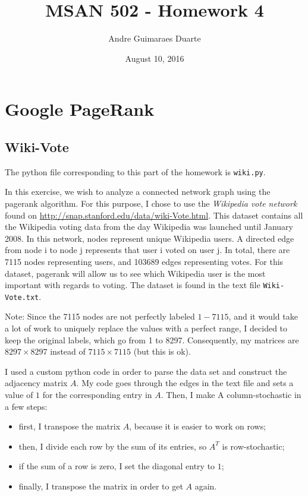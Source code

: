 \documentclass[]{article}
\title{MSAN 502 - Homework 4}
\author{Andre Guimaraes Duarte}
\date{August 10, 2016}
\begin{document}
\maketitle

\section*{Google PageRank}
\subsection*{Wiki-Vote}
The python file corresponding to this part of the homework is \texttt{wiki.py}.

In this exercise, we wish to analyze a connected network graph using the pagerank algorithm. For this purpose, I chose to use the \textit{Wikipedia vote network} found on \url{http://snap.stanford.edu/data/wiki-Vote.html}. This dataset contains all the Wikipedia voting data from the day Wikipedia was launched until January 2008. In this network, nodes represent unique Wikipedia users. A directed edge from node i to node j represents that user i voted on user j. In total, there are 7115 nodes representing users, and 103689 edges representing votes. For this dataset, pagerank will allow us to see which Wikipedia user is the most important with regards to voting. The dataset is found in the text file \texttt{Wiki-Vote.txt}.

Note: Since the 7115 nodes are not perfectly labeled $1 - 7115$, and it would take a lot of work to uniquely replace the values with a perfect range, I decided to keep the original labels, which go from 1 to 8297. Consequently, my matrices are $8297 \times 8297$ instead of $7115 \times 7115$ (but this is ok).

I used a custom python code in order to parse the data set and construct the adjacency matrix $A$. My code goes through the edges in the text file and sets a value of $1$ for the corresponding entry in $A$. Then, I make A column-stochastic in a few steps:

\begin{itemize}
\item first, I transpose the matrix $A$, because it is easier to work on rows;
\item then, I divide each row by the sum of its entries, so $A^T$ is row-stochastic;
\item if the sum of a row is zero, I set the diagonal entry to $1$;
\item finally, I transpose the matrix in order to get $A$ again.
\end{itemize}
\end{document}
